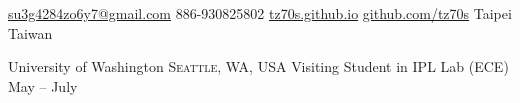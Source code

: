 \documentclass[10pt,a4paper]{article}
\begin{document}
\sloppy  %


\nobreakvspace{0.3em}  %

\noindent\href{mailto:su3g4284zo6y7@gmail.com}{su3g4284zo6y7\mbox{}@\mbox{}gmail.com}\sbull
\textsmaller{+}886-930825802\sbull
\href{https://tz70s.github.io}{tz70s.github.io}\sbull
\href{https://github.com/tz70s}{github.com/tz70s}\sbull
Taipei\sbull
Taiwan
\spacedhrule{0.9em}{-0.4em}  %





\vspace{0.2em}

\headedsection  %
  {University of Washington}
  {\textsc{Seattle, WA, USA}} {
  \vspace{0.2em}
  \headedsubsection
    {Visiting Student in IPL Lab (ECE)}
    {May  -- July }
    {}
}

\vspace{0.2em}
\end{document}
